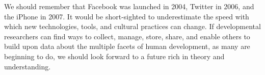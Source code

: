 \documentclass[letterpaper,man,apacite,natbib]{apa6}
\begin{document}
We should remember that Facebook was launched in 2004, Twitter in 2006, and the iPhone in 2007.
It would be short-sighted to underestimate the speed with which new technologies, tools, and cultural practices can change.
If developmental researchers can find ways to collect, manage, store, share, and enable others to build upon data about the multiple facets of human development, as many are beginning to do, we should look forward to a future rich in theory and understanding.





\end{document}
